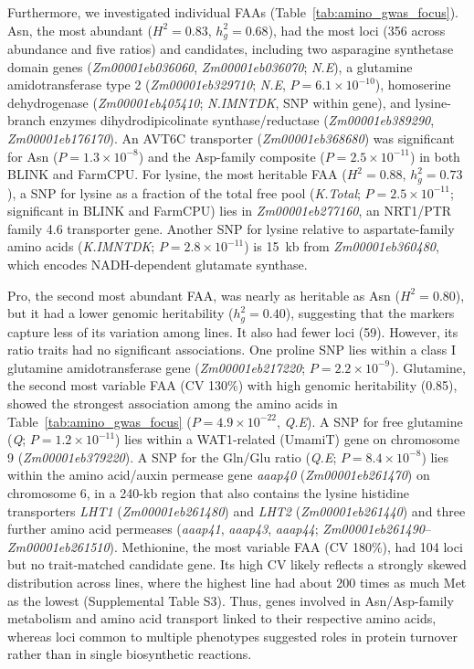 \documentclass[namedate,unnumsec,webpdf,contemporary,large]{oup-authoring-template}
\begin{document}
Furthermore, we investigated individual FAAs (Table~\ref{tab:amino_gwas_focus}). Asn, the most abundant ($H^2=0.83$, $h^2_g=0.68$), had the most loci (356 across abundance and five ratios) and candidates, including two asparagine synthetase domain genes (\textit{Zm00001eb036060}, \textit{Zm00001eb036070}; \textit{N.E}), a glutamine amidotransferase type 2 (\textit{Zm00001eb329710}; \textit{N.E}, $P=6.1\times10^{-10}$), homoserine dehydrogenase (\textit{Zm00001eb405410}; \textit{N.IMNTDK}, SNP within gene), and lysine-branch enzymes dihydrodipicolinate synthase/reductase (\textit{Zm00001eb389290}, \textit{Zm00001eb176170}). An AVT6C transporter (\textit{Zm00001eb368680}) was significant for Asn ($P=1.3\times10^{-8}$) and the Asp-family composite ($P=2.5\times10^{-11}$) in both BLINK and FarmCPU. For lysine, the most heritable FAA ($H^2 = 0.88$, $h^2_g = 0.73$), a SNP for lysine as a fraction of the total free pool (\textit{K.Total}; $P = 2.5 \times 10^{-11}$; significant in BLINK and FarmCPU) lies in \textit{Zm00001eb277160}, an NRT1/PTR family 4.6 transporter gene. Another SNP for lysine relative to aspartate-family amino acids (\textit{K.IMNTDK}; $P = 2.8 \times 10^{-11}$) is 15~kb from \textit{Zm00001eb360480}, which encodes NADH-dependent glutamate synthase.

Pro, the second most abundant FAA, was nearly as heritable as Asn ($H^2 = 0.80$), but it had a lower genomic heritability ($h^2_g = 0.40$), suggesting that the markers capture less of its variation among lines. It also had fewer loci (59). However, its ratio traits had no significant associations. One proline SNP lies within a class I glutamine amidotransferase gene (\textit{Zm00001eb217220}; $P = 2.2 \times 10^{-9}$). Glutamine, the second most variable FAA (CV 130\%) with high genomic heritability (0.85), showed the strongest association among the amino acids in Table~\ref{tab:amino_gwas_focus} ($P = 4.9 \times 10^{-22}$, \textit{Q.E}). A SNP for free glutamine (\textit{Q}; $P = 1.2 \times 10^{-11}$) lies within a WAT1-related (UmamiT) gene on chromosome 9 (\textit{Zm00001eb379220}). A SNP for the Gln/Glu ratio (\textit{Q.E}; $P = 8.4 \times 10^{-8}$) lies within the amino acid/auxin permease gene \textit{aaap40} (\textit{Zm00001eb261470}) on chromosome 6, in a 240-kb region that also contains the lysine histidine transporters \textit{LHT1} (\textit{Zm00001eb261480}) and \textit{LHT2} (\textit{Zm00001eb261440}) and three further amino acid permeases (\textit{aaap41}, \textit{aaap43}, \textit{aaap44}; \textit{Zm00001eb261490}--\textit{Zm00001eb261510}). Methionine, the most variable FAA (CV 180\%), had 104 loci but no trait-matched candidate gene. Its high CV likely reflects a strongly skewed distribution across lines, where the highest line had about 200 times as much Met as the lowest (Supplemental Table S3). Thus, genes involved in Asn/Asp-family metabolism and amino acid transport linked to their respective amino acids, whereas loci common to multiple phenotypes suggested roles in protein turnover rather than in single biosynthetic reactions.
\end{document}
